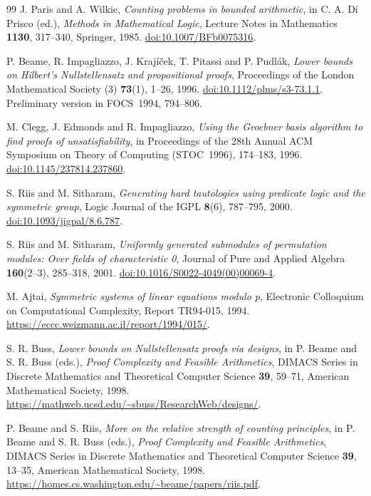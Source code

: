 \begin{thebibliography}{99}
J. Paris and A. Wilkie, \emph{Counting problems in bounded arithmetic},
in C. A. Di Prisco (ed.), \emph{Methods in Mathematical Logic},
Lecture Notes in Mathematics \textbf{1130}, 317--340, Springer, 1985.
\href{https://doi.org/10.1007/BFb0075316}{doi:10.1007/BFb0075316}.


P. Beame, R. Impagliazzo, J. Kraj\'i\v cek, T. Pitassi and P. Pudl\'ak,
\emph{Lower bounds on Hilbert's Nullstellensatz and propositional proofs},
Proceedings of the London Mathematical Society (3)
\textbf{73}(1), 1--26, 1996.
\href{https://doi.org/10.1112/plms/s3-73.1.1}{doi:10.1112/plms/s3-73.1.1}.
Preliminary version in FOCS~1994, 794--806.

M. Clegg, J. Edmonds and R. Impagliazzo,
\emph{Using the Groebner basis algorithm to find proofs of unsatisfiability},
in Proceedings of the 28th Annual ACM Symposium on Theory of Computing
(STOC~1996), 174--183, 1996.
\href{https://doi.org/10.1145/237814.237860}{doi:10.1145/237814.237860}.

S. Riis and M. Sitharam,
\emph{Generating hard tautologies using predicate logic and the symmetric group},
Logic Journal of the IGPL \textbf{8}(6), 787--795, 2000.
\href{https://doi.org/10.1093/jigpal/8.6.787}{doi:10.1093/jigpal/8.6.787}.

S. Riis and M. Sitharam,
\emph{Uniformly generated submodules of permutation modules:
Over fields of characteristic 0},
Journal of Pure and Applied Algebra \textbf{160}(2--3), 285--318, 2001.
\href{https://doi.org/10.1016/S0022-4049(00)00069-4}{doi:10.1016/S0022-4049(00)00069-4}.

M. Ajtai, \emph{Symmetric systems of linear equations modulo p},
Electronic Colloquium on Computational Complexity, Report TR94-015, 1994.
\url{https://eccc.weizmann.ac.il/report/1994/015/}.

S. R. Buss, \emph{Lower bounds on Nullstellensatz proofs via designs},
in P. Beame and S. R. Buss (eds.), \emph{Proof Complexity and Feasible
Arithmetics}, DIMACS Series in Discrete Mathematics and Theoretical
Computer Science \textbf{39}, 59--71, American Mathematical Society, 1998.
\url{https://mathweb.ucsd.edu/~sbuss/ResearchWeb/designs/}.

P. Beame and S. Riis, \emph{More on the relative strength of counting
principles}, in P. Beame and S. R. Buss (eds.), \emph{Proof Complexity
and Feasible Arithmetics}, DIMACS Series in Discrete Mathematics and
Theoretical Computer Science \textbf{39}, 13--35,
American Mathematical Society, 1998.
\url{https://homes.cs.washington.edu/~beame/papers/riis.pdf}.


\end{thebibliography}
